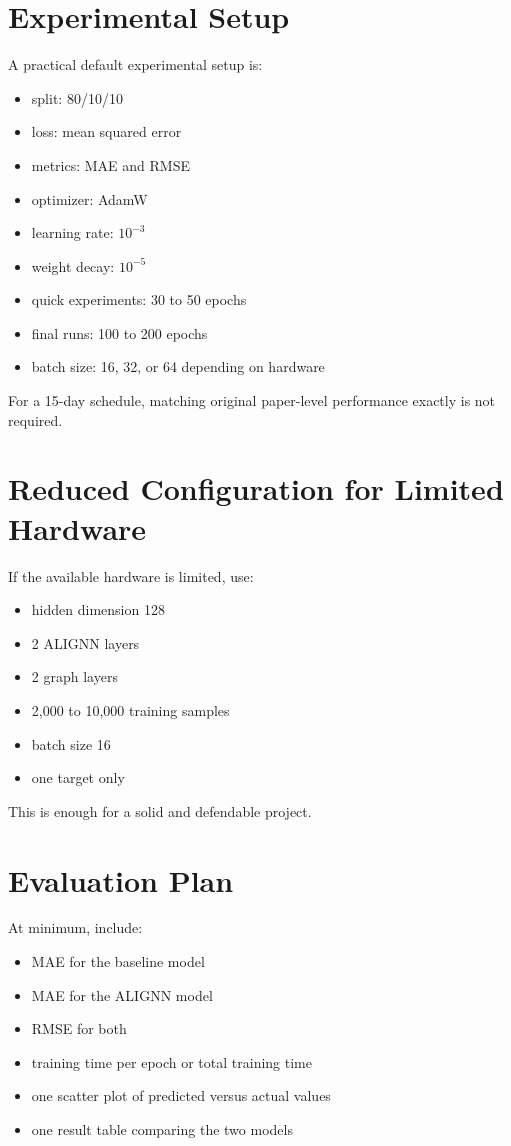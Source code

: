 \documentclass[12pt]{article}
\begin{document}
\section{Experimental Setup}
A practical default experimental setup is:

\begin{itemize}
    \item split: 80/10/10
    \item loss: mean squared error
    \item metrics: MAE and RMSE
    \item optimizer: AdamW
    \item learning rate: \(10^{-3}\)
    \item weight decay: \(10^{-5}\)
    \item quick experiments: 30 to 50 epochs
    \item final runs: 100 to 200 epochs
    \item batch size: 16, 32, or 64 depending on hardware
\end{itemize}

For a 15-day schedule, matching original paper-level performance exactly is not required.

\section{Reduced Configuration for Limited Hardware}
If the available hardware is limited, use:

\begin{itemize}
    \item hidden dimension 128
    \item 2 ALIGNN layers
    \item 2 graph layers
    \item 2,000 to 10,000 training samples
    \item batch size 16
    \item one target only
\end{itemize}

This is enough for a solid and defendable project.

\section{Evaluation Plan}
At minimum, include:

\begin{itemize}
    \item MAE for the baseline model
    \item MAE for the ALIGNN model
    \item RMSE for both
    \item training time per epoch or total training time
    \item one scatter plot of predicted versus actual values
    \item one result table comparing the two models
\end{itemize}
\end{document}
